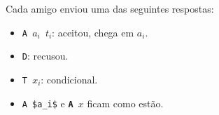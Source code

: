 Cada amigo enviou uma das seguintes respostas:
\begin{itemize}
    \item \texttt{A $a_i$ $t_i$}: aceitou, chega em $a_i$.
    \item \texttt{D}: recusou.
    \item {\tt T $x_i$}: condicional.
    \item \verb|A $a_i$| e \texttt{\textbf{A} $x$} ficam como estão.
\end{itemize}

